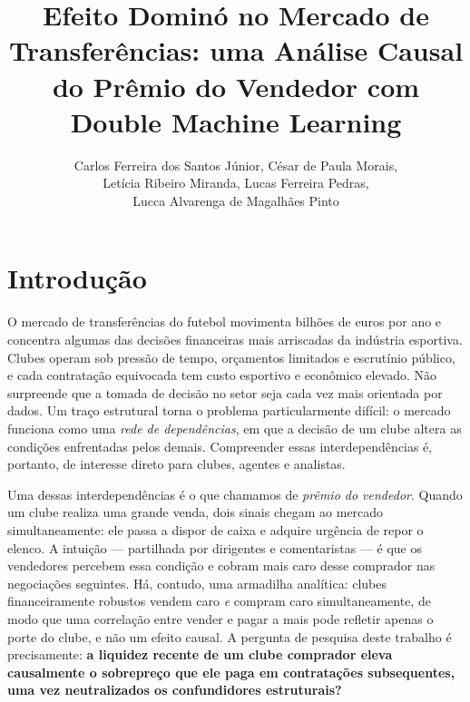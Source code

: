 \documentclass[12pt]{article}
\title{Efeito Dominó no Mercado de Transferências: uma Análise Causal do Prêmio do Vendedor com Double Machine Learning}
\author{
Carlos Ferreira dos Santos Júnior\inst{1},
César de Paula Morais\inst{1},\\
Letícia Ribeiro Miranda\inst{1},
Lucas Ferreira Pedras\inst{1},\\
Lucca Alvarenga de Magalhães Pinto\inst{1}
}
\begin{document}
\maketitle

\section{Introdução}

O mercado de transferências do futebol movimenta bilhões de euros por ano e concentra algumas das
decisões financeiras mais arriscadas da indústria esportiva. Clubes operam sob pressão de tempo,
orçamentos limitados e escrutínio público, e cada contratação equivocada tem custo esportivo e
econômico elevado. Não surpreende que a tomada de decisão no setor seja cada vez mais orientada por
dados. Um traço estrutural torna o problema particularmente difícil: o mercado funciona como uma
\textit{rede de dependências}, em que a decisão de um clube altera as condições enfrentadas pelos
demais. Compreender essas interdependências é, portanto, de interesse direto para clubes, agentes e
analistas.

Uma dessas interdependências é o que chamamos de \textit{prêmio do vendedor}. Quando um clube realiza
uma grande venda, dois sinais chegam ao mercado simultaneamente: ele passa a dispor de caixa e
adquire urgência de repor o elenco. A intuição — partilhada por dirigentes e comentaristas — é que os
vendedores percebem essa condição e cobram mais caro desse comprador nas negociações seguintes. Há,
contudo, uma armadilha analítica: clubes financeiramente robustos vendem caro \textit{e} compram caro
simultaneamente, de modo que uma correlação entre vender e pagar a mais pode refletir apenas o porte
do clube, e não um efeito causal. A pergunta de pesquisa deste trabalho é precisamente:
\textbf{a liquidez recente de um clube comprador eleva causalmente o sobrepreço que ele paga em
contratações subsequentes, uma vez neutralizados os confundidores estruturais?}
\end{document}
